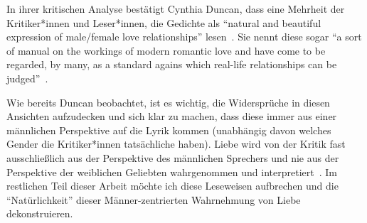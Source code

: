 In ihrer kritischen Analyse bestätigt Cynthia Duncan, dass eine Mehrheit der Kritiker*innen und Leser*innen, die Gedichte als ``natural and beautiful expression of male/female love relationships'' lesen~\cite{Duncan1992}.
Sie nennt diese sogar %
``a sort of manual on the workings of modern romantic love and have come to be regarded, by many, as a standard agains which real-life relationships can be judged''~\cite{Duncan1992}.

\begin{comment}
``Others who have treated Neruda's love poetry from the male perspective include: Aguirre, Alazraki, Alonso, Durán, Pérez, and Pimentel. While I do not disparage the work of these or other critics of Neruda's poetry, I feel that they have contributed to the notion that the texts are "natural" reflections of male/female relationships and that the position of the woman in the texts is an enviable one. To my knowledge, the only critics to date who have acknowledged that the asence of a feminine perspective in Neruda's poetry is problematic are John Felstiner and Marjorie Agosin.''

\end{comment}

Wie bereits Duncan beobachtet, ist es wichtig, die Widersprüche in diesen Ansichten aufzudecken
und sich klar zu machen, dass diese immer aus einer männlichen Perspektive auf die Lyrik kommen (unabhängig davon welches Gender die Kritiker*innen tatsächliche haben).
Liebe wird von der Kritik fast ausschließlich aus der Perspektive des männlichen Sprechers und nie aus der Perspektive der weiblichen Geliebten wahrgenommen und interpretiert~\cite{Duncan1992}.
Im restlichen Teil dieser Arbeit möchte ich diese Leseweisen aufbrechen und die ``Natürlichkeit'' dieser Männer-zentrierten Wahrnehmung von Liebe dekonstruieren.

